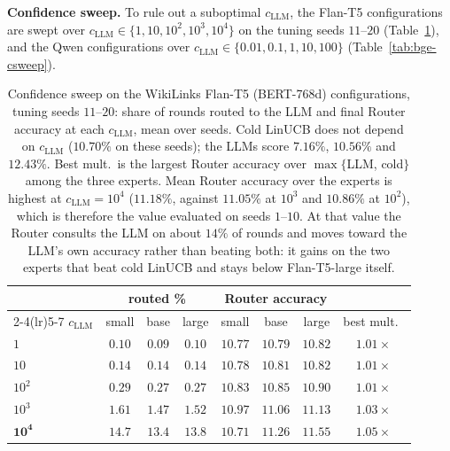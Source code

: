 \documentclass[anon]{alt2027} %
\begin{document}
\textbf{Confidence sweep.} To rule out a suboptimal $c_{\mathrm{LLM}}$, the Flan-T5
configurations are swept over $c_{\mathrm{LLM}}\in\{1,10,10^2,10^3,10^4\}$ on the tuning seeds
$11$--$20$ (Table~\ref{tab:wiki-csweep}), and the Qwen configurations over
$c_{\mathrm{LLM}}\in\{0.01,0.1,1,10,100\}$ (Table~\ref{tab:bge-csweep}).

\begin{table}[ht]
\centering
\caption{Confidence sweep on the WikiLinks Flan-T5 (BERT-768d) configurations,
tuning seeds $11$--$20$: share of rounds routed to the LLM and final Router
accuracy at each $c_{\mathrm{LLM}}$, mean over seeds. Cold LinUCB does not depend on $c_{\mathrm{LLM}}$
($10.70\%$ on these seeds); the LLMs score $7.16\%$, $10.56\%$ and $12.43\%$.
Best mult.\ is the largest Router accuracy over $\max\{$LLM, cold$\}$ among the
three experts. Mean Router accuracy over the experts is highest at
$c_{\mathrm{LLM}}=10^4$ ($11.18\%$, against $11.05\%$ at $10^3$ and $10.86\%$ at $10^2$),
which is therefore the value evaluated on seeds $1$--$10$. At that value the
Router consults the LLM on about $14\%$ of rounds and moves toward the LLM's
own accuracy rather than beating both: it gains on the two experts that beat
cold LinUCB and stays below Flan-T5-large itself.}
\label{tab:wiki-csweep}
\scriptsize
\setlength{\tabcolsep}{4pt}
\begin{tabular}{@{}lccccccc@{}}
\toprule
& \multicolumn{3}{c}{routed \%} & \multicolumn{3}{c}{Router accuracy} & \\
\cmidrule(lr){2-4}\cmidrule(lr){5-7}
$c_{\mathrm{LLM}}$ & small & base & large & small & base & large & best mult.\ \\
\midrule
$1$ & $0.10$ & $0.09$ & $0.10$ & $10.77$ & $10.79$ & $10.82$ & $1.01\times$ \\
$10$ & $0.14$ & $0.14$ & $0.14$ & $10.78$ & $10.81$ & $10.82$ & $1.01\times$ \\
$10^2$ & $0.29$ & $0.27$ & $0.27$ & $10.83$ & $10.85$ & $10.90$ & $1.01\times$ \\
$10^3$ & $1.61$ & $1.47$ & $1.52$ & $10.97$ & $11.06$ & $11.13$ & $1.03\times$ \\
$\mathbf{10^4}$ & $14.7$ & $13.4$ & $13.8$ & $10.71$ & $11.26$ & $\mathbf{11.55}$ & $\mathbf{1.05\times}$ \\
\bottomrule
\end{tabular}
\end{table}
\end{document}
